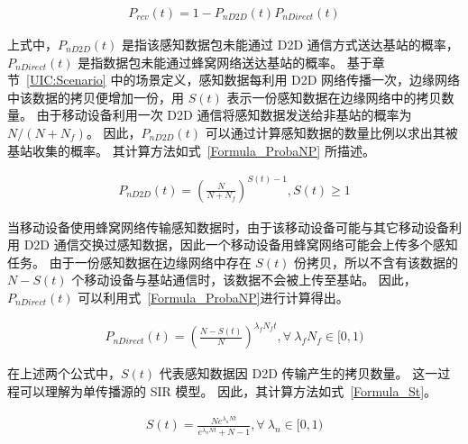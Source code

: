 \vspace{-1em}
\begin{equation}
  \label{Formula_ProbaRcvT}
  \begin{aligned}
    P_{rcv}(t) = 1 - P_{nD2D}(t) P_{nDirect}(t)
  \end{aligned}
\end{equation}

上式中，$P_{nD2D}(t)$ 是指该感知数据包未能通过 D2D 通信方式送达基站的概率，$P_{nDirect}(t)$ 是指数据包未能通过蜂窝网络送达基站的概率。
基于章节~\ref{UIC:Scenario} 中的场景定义，感知数据每利用 D2D 网络传播一次，边缘网络中该数据的拷贝便增加一份，用 $S(t)$ 表示一份感知数据在边缘网络中的拷贝数量。
由于移动设备利用一次 D2D 通信将感知数据发送给非基站的概率为 $N/(N + N_f)$。
因此，$P_{nD2D}(t)$ 可以通过计算感知数据的数量比例以求出其被基站收集的概率。
其计算方法如式~\eqref{Formula_ProbaNP} 所描述。

\begin{equation}
  \label{Formula_ProbaNP}
  \begin{aligned}
  P_{nD2D}(t) = (\frac{N}{N + N_f})^{S(t) - 1}, S(t) \geq 1
  \end{aligned}
\end{equation}

当移动设备使用蜂窝网络传输感知数据时，由于该移动设备可能与其它移动设备利用 D2D 通信交换过感知数据，因此一个移动设备用蜂窝网络可能会上传多个感知任务。
由于一份感知数据在边缘网络中存在 $S(t)$ 份拷贝，所以不含有该数据的 $N - S(t)$ 个移动设备与基站通信时，该数据不会被上传至基站。
因此，$P_{nDirect}(t)$ 可以利用式~\eqref{Formula_ProbaNP}进行计算得出。

\begin{equation}
  \label{Formula_ProbaNA}
  \begin{aligned}
  P_{nDirect}(t) = (\frac{N-S(t)}{N})^{\lambda_f N_f t}, \forall \ \lambda_f N_f \in [0,1)
  \end{aligned}
\end{equation}

在上述两个公式中，$S(t)$ 代表感知数据因 D2D 传输产生的拷贝数量。
这一过程可以理解为单传播源的 SIR 模型。
因此，其计算方法如式~\eqref{Formula_St}。

\begin{equation}
\label{Formula_St}
  \begin{aligned}
    S(t) = \frac{N e^{\lambda_n N t}}{e^{\lambda_n N t} + N -1}, \forall \ \lambda_n \in [0,1)
  \end{aligned}
\end{equation}

